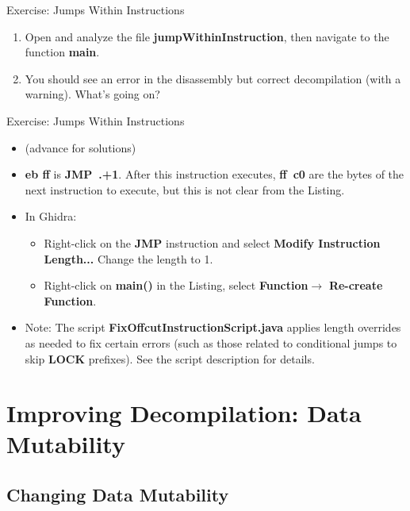 \documentclass{beamer}
\begin{document}
\begin{frame}
\begin{block}{Exercise: Jumps Within Instructions}
\begin{enumerate}
\item Open and analyze the file \textbf{jumpWithinInstruction}, then navigate to the function \textbf{main}.
\item You should see an error in the disassembly but correct decompilation (with a warning).  What's going on?
\end{enumerate}
\end{block}
\end{frame}

\begin{frame}
\begin{block}{Exercise: Jumps Within Instructions}
\begin{itemize}
\item[] (advance for solutions)
\pause
\item \textbf{eb ff} is \textbf{JMP~.+1}.  After this instruction executes, \textbf{ff~c0} are the bytes of the next instruction to execute, but this is not clear from the Listing.  
\item In Ghidra:
\begin{itemize}
\item Right-click on the \textbf{JMP} instruction and select \textbf{Modify Instruction Length...}  Change the length to 1.
\item Right-click on \textbf{main()} in the Listing, select \textbf{Function}$\rightarrow$ \textbf{Re-create Function}.
\end{itemize} 
\item Note: The script \textbf{FixOffcutInstructionScript.java} applies length overrides as needed to fix certain errors (such as those related to conditional jumps to skip \textbf{LOCK} prefixes).  See the script description for details.
\end{itemize}
\end{block}
\end{frame}

\section{Improving Decompilation: Data Mutability}

\subsection{Changing Data Mutability}
\end{document}
